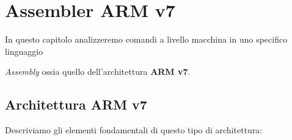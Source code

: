 \documentclass{article}
\begin{document}
\newpage

\section{Assembler ARM v7}

In questo capitolo analizzeremo comandi a livello macchina in uno specifico linguaggio

\textit{Assembly} ossia quello dell'architettura \textbf{ARM v7}.

\vspace*{15px}

\subsection{Architettura ARM v7}

Descriviamo gli elementi fondamentali di questo tipo di architettura:
\end{document}
